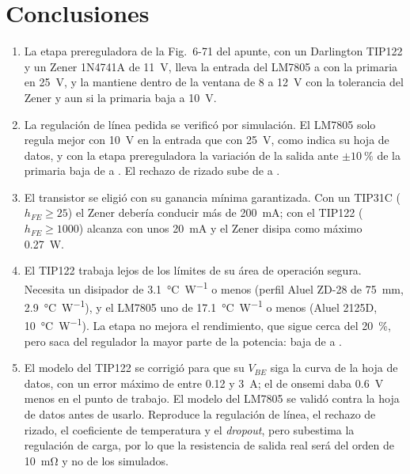 \raggedbottom
\section{Conclusiones}
\begin{enumerate}
    \item La etapa prereguladora de la Fig.~6-71 del apunte, con un Darlington TIP122 y un Zener 1N4741A de \SI{11}{\volt}, lleva la entrada del LM7805 a  con la primaria en \SI{25}{\volt}, y la mantiene dentro de la ventana de \SI{8}{} a \SI{12}{\volt} con la tolerancia del Zener y aun si la primaria baja a \SI{10}{\volt}.
    \item La regulación de línea pedida se verificó por simulación. El LM7805 solo regula mejor con \SI{10}{\volt} en la entrada que con \SI{25}{\volt}, como indica su hoja de datos, y con la etapa prereguladora la variación de la salida ante $\pm\SI{10}{\percent}$ de la primaria baja de  a . El rechazo de rizado sube de  a .
    \item El transistor se eligió con su ganancia mínima garantizada. Con un TIP31C ($h_{FE} \geq 25$) el Zener debería conducir más de \SI{200}{\milli\ampere}; con el TIP122 ($h_{FE} \geq 1000$) alcanza con unos \SI{20}{\milli\ampere} y el Zener disipa como máximo \SI{0,27}{\watt}.
    \item El TIP122 trabaja lejos de los límites de su área de operación segura. Necesita un disipador de \SI{3,1}{\celsius\per\watt} o menos (perfil Aluel ZD-28 de \SI{75}{\milli\meter}, \SI{2,9}{\celsius\per\watt}), y el LM7805 uno de \SI{17,1}{\celsius\per\watt} o menos (Aluel 2125D, \SI{10}{\celsius\per\watt}). La etapa no mejora el rendimiento, que sigue cerca del \SI{20}{\percent}, pero saca del regulador la mayor parte de la potencia: baja de  a .
    \item El modelo del TIP122 se corrigió para que su $V_{BE}$ siga la curva de la hoja de datos, con un error máximo de  entre \SI{0,12}{} y \SI{3}{\ampere}; el de onsemi daba \SI{0,6}{\volt} menos en el punto de trabajo. El modelo del LM7805 se validó contra la hoja de datos antes de usarlo. Reproduce la regulación de línea, el rechazo de rizado, el coeficiente de temperatura y el \emph{dropout}, pero subestima la regulación de carga, por lo que la resistencia de salida real será del orden de \SI{10}{\milli\ohm} y no de los  simulados.
\end{enumerate}

